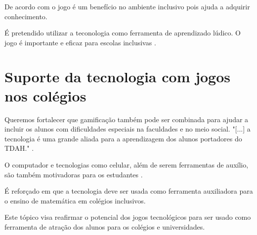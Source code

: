 De acordo com \cite{jogoPratPedagoc} o jogo é um benefício no ambiente inclusivo pois ajuda a adquirir conhecimento.

É pretendido utilizar a teconologia como ferramenta de aprendizado lúdico. O jogo é importante e eficaz para escolas inclusivas \cite{jogoPratPedagoc}.

\begin{comment}
Foram anotadas algumas observações sobre os experimentos realizados em estudantes com TDAH para ser lembrado de incluir nos requisitos do jogo para aumentar o público alvo. A seguir alguns itens: 

Crianças com TDAH precisam de um feedback mais frequente. O feedback deve ser apresentado no momento do comportamento visado. Porém o próprio feedback pode causar uma distração, então ele deve ser feito seguido de uma chamada de atenção que redirecione o aluno para a próxima tarefa a ser cumprida (George J. DuPaul, PhD e Gary Stoner, PhD. p. 131-132).

O nível de complexidade das equações e das dificuldades aumentará gradativamente. Para pessoas com TDAH a facilidade em jogar é maior quando inicia-se com instruções iniciais simples e com pouco número de etapas. Para fixar melhor o entendimento do aluno sobre a atividade pede-se que a pessoa repita o que foi pedido como objetivo para completar a atividade. Ao existirem erros em atividade é bom variar as atividades para evitar o cansaço por repetição (George J. DuPaul, PhD e Gary Stoner, PhD. p.132).

Recompensas devem ser dadas para que a motivação aumente. Porém a pessoa deve escolher o prêmio desejado ao invés de ser entregue um prêmio que ela não deseje. Para isso antes da atividade é necessário a fase de negociação para que seja escolhidos possíveis prêmios que sirvam como motivação (George J. DuPaul, PhD e Gary Stoner, PhD. p.133).

\end{comment}


\section[Suporte da tecnologia com jogos nos colégios]{Suporte da tecnologia com jogos nos colégios}
Queremos fortalecer que gamificação também pode ser combinada para ajudar a incluir os alunos com dificuldades especiais na faculdades e no meio social. "[...] a tecnologia é uma grande aliada para a aprendizagem dos alunos portadores do TDAH."  \cite{matEtdah1}.

O computador e tecnologias como celular, além de serem ferramentas de auxílio, são também  motivadoras para os estudantes \cite{softwaregamificado}.

É reforçado em \cite{revbibmatgam} que a tecnologia deve ser usada como ferramenta auxiliadora para o ensino de matemática em colégios inclusivos.

Este tópico visa reafirmar o potencial dos jogos tecnológicos para ser usado como ferramenta de atração dos alunos para os colégios e universidades.